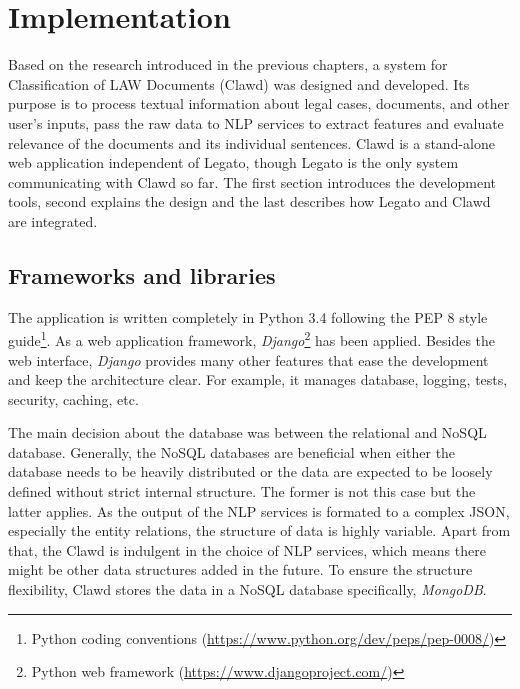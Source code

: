 \documentclass[
  digital, %
  notable,   %
  nolof,     %
  nolot,     %
]{fithesis3}
\begin{document}
\chapter{Implementation}
\label{chp:implementation}
Based on the research introduced in the previous chapters, a system for Classification of LAW Documents (Clawd) was designed and developed.
Its purpose is to process textual information about legal cases, documents, and other user's inputs, pass the raw data to NLP services to extract features and evaluate relevance of the documents and its individual sentences.
Clawd is a stand-alone web application independent of Legato, though Legato is the only system communicating with Clawd so far.
The first section introduces the development tools, second explains the design and the last describes how Legato and Clawd are integrated.

\section{Frameworks and libraries}
The application is written completely in Python 3.4 following the PEP 8 style guide\footnote{Python coding conventions (\url{https://www.python.org/dev/peps/pep-0008/})}.
As a web application framework, \textit{Django}\footnote{Python web framework (\url{https://www.djangoproject.com/})} has been applied.
Besides the web interface, \textit{Django} provides many other features that ease the development and keep the architecture clear.
For example, it manages database, logging, tests, security, caching, etc.

The main decision about the database was between the relational and NoSQL database.
Generally, the NoSQL databases are beneficial when either the database needs to be heavily distributed or the data are expected to be loosely defined without strict internal structure.
The former is not this case but the latter applies.
As the output of the NLP services is formated to a complex JSON, especially the entity relations, the structure of data is highly variable.
Apart from that, the Clawd is indulgent in the choice of NLP services, which means there might be other data structures added in the future.
To ensure the structure flexibility, Clawd stores the data in a NoSQL database specifically, \textit{MongoDB}.
\end{document}
